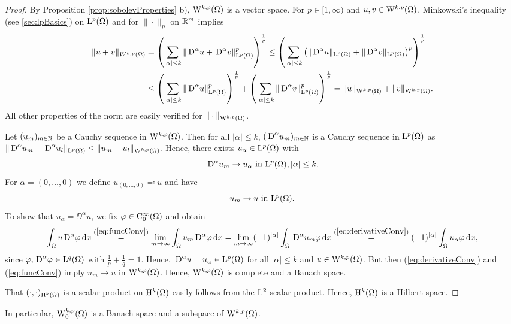 \begin{proof}
  By Proposition \ref{prop:sobolevProperties} b), $\mathrm{W}^{k,p}(\Omega)$ is a vector space.
  For $p \in [1,\infty)$ and $u,v \in \mathrm{W}^{k,p}(\Omega)$, Minkowski's inequality (see \ref{sec:lpBasics}) on $\mathrm{L}^p(\Omega)$ and for $\|\cdot\|_p$ on $\mathbb{R}^m$ implies
    \begin{align*}
      \|u + v\|_{W^{k,p}(\Omega)}
      &= \left( \sum_{|\alpha| \leq k} \|\,{\operatorname{D}}^\alpha u + \,{\operatorname{D}}^\alpha v\|^p_{\mathrm{L}^p(\Omega)} \right)^{\frac{1}{p}} 
      \leq \left( \sum_{|\alpha|\leq k} \left( \|\,{\operatorname{D}}^\alpha u\|_{\mathrm{L}^p(\Omega)} + \|\,{\operatorname{D}}^\alpha v\|_{\mathrm{L}^p(\Omega)} \right)^p \right)^{\frac{1}{p}} \\
      &\leq \left( \sum_{|\alpha| \leq k} \|\,{\operatorname{D}}^\alpha u\|_{\mathrm{L}^p(\Omega)}^p\right)^{\frac{1}{p}}
      + \left( \sum_{|\alpha| \leq k} \|\,{\operatorname{D}}^\alpha v\|_{\mathrm{L}^p(\Omega)}^p\right)^{\frac{1}{p}}
      = \|u\|_{\mathrm{W}^{k,p}(\Omega)} + \|v\|_{\mathrm{W}^{k,p}(\Omega)}.
    \end{align*}
    All other properties of the norm are easily verified for $\|\cdot\|_{\mathrm{W}^{k,p}(\Omega)}$.

    Let $(u_m)_{m \in \mathbb{N}}$ be a Cauchy sequence in $\mathrm{W}^{k,p}(\Omega)$.
    Then for all $|\alpha|\leq k$, $(\,{\operatorname{D}}^\alpha u_m)_{m \in \mathbb{N}}$ is a Cauchy sequence in $\mathrm{L}^p(\Omega)$ as 
    $
    \|\,{\operatorname{D}}^\alpha u_m - \,{\operatorname{D}}^\alpha u_l \|_{\mathrm{L}^p(\Omega)} \leq \|u_m - u_l \|_{\mathrm{W}^{k,p}(\Omega)}.
    $
    Hence, there exists $u_\alpha \in \mathrm{L}^p(\Omega)$ with
    \begin{equation}
      \label{eq:derivativeConv}
      \,{\operatorname{D}}^\alpha u_m \to u_\alpha \text{ in } \mathrm{L}^p(\Omega), |\alpha| \leq k.
    \end{equation}
    For $\alpha = (0,\dots,0)$ we define $u_{(0,\dots,0)}  \eqqcolon u$ and have
    \begin{equation}
      \label{eq:funcConv}
      u_m \to u \text{ in } \mathrm{L}^p(\Omega).
    \end{equation}
    To show that $u_\alpha = \DD^\alpha u$, we fix $\varphi \in \mathrm{C}_0^\infty(\Omega)$ and obtain
    \begin{align*}
      \int_\Omega u \,{\operatorname{D}}^\alpha \varphi \, {\operatorname{d}\!{x}}
      \overset{(\ref{eq:funcConv})}{=} \lim_{m \to \infty} \int_\Omega u_m \,{\operatorname{D}}^\alpha \varphi \, {\operatorname{d}\!{x}} 
      = \lim_{m \to \infty} (-1)^{|\alpha|} \int_\Omega \,{\operatorname{D}}^\alpha u_m \varphi \, {\operatorname{d}\!{x}} 
      \overset{(\ref{eq:derivativeConv})}{=} (-1)^{|\alpha|} \int_\Omega u_\alpha \varphi \, {\operatorname{d}\!{x}},
    \end{align*}
    since $\varphi, \,{\operatorname{D}}^\alpha \varphi \in \mathrm{L}^q(\Omega)$ with $\frac{1}{p} + \frac{1}{q} = 1$. Hence, $\,{\operatorname{D}}^\alpha u = u_\alpha \in \mathrm{L}^p(\Omega)$ for all $|\alpha| \leq k$ and $u \in \mathrm{W}^{k,p}(\Omega)$.
    But then (\ref{eq:derivativeConv}) and (\ref{eq:funcConv}) imply $u_m \to u$ in $\mathrm{W}^{k,p}(\Omega)$.
    Hence, $\mathrm{W}^{k,p}(\Omega)$ is complete and a Banach space.

    That $(\cdot,\cdot)_{\mathrm{H}^k(\Omega)}$ is a scalar product on $\mathrm{H}^k(\Omega)$ easily follows from the $\mathrm{L}^2$-scalar product.
    Hence, $\mathrm{H}^k(\Omega)$ is a Hilbert space.
\end{proof}

In particular, $\mathrm{W}_0^{k,p}(\Omega)$ is a Banach space and a subspace of $\mathrm{W}^{k,p}(\Omega)$.
